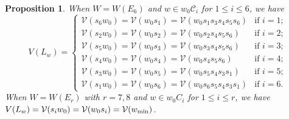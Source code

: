 \documentclass[11pt, reqno]{amsart}
\newtheorem{prop}[Thm]{Proposition}
\theoremstyle{definition}
\numberwithin{equation}{section}
\begin{document}
\begin{prop}
    When $W=W(E_6)$ and $w\in w_0\mathcal{C}_i$ for $1\leq i\leq 6$, we have 
    \[
V(L_w)=
\begin{cases}
\mathcal V(s_6w_0)=\mathcal V(w_0s_1)=\mathcal V(w_0s_1s_3s_4s_5s_6) & \text{if~}i=1;\\
\mathcal V(s_2w_0)=\mathcal V(w_0s_2)=\mathcal V(w_0s_2s_4s_5s_6) & \text{if~}i=2;\\
\mathcal V(s_5w_0)=\mathcal V(w_0s_3)=\mathcal V(w_0s_3s_4s_5s_6) & \text{if~}i=3;\\
\mathcal V(s_4w_0)=\mathcal V(w_0s_4)=\mathcal V(w_0s_4s_5s_6) & \text{if~}i=4;\\
\mathcal V(s_3w_0)=\mathcal V(w_0s_5)=\mathcal V(w_0s_5s_4s_3s_1) & \text{if~}i=5;\\
\mathcal V(s_1w_0)=\mathcal V(w_0s_6)=\mathcal V(w_0s_6s_5s_4s_3s_1) & \text{if~}i=6.
\end{cases}
\]
When $W = W(E_r)$ with $r=7,8$ and $w \in w_0 C_i$ for $1 \le i \le r$, we have $V(L_w)=\mathcal V(s_iw_0)=\mathcal{V}(w_0s_i)=\mathcal{V}(w_{\rm min})$.



\end{prop}
\end{document}
